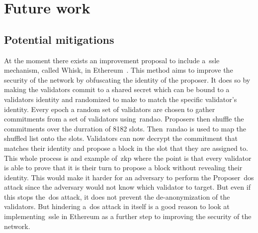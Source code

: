 

\section{Future work}\label{sec:future-works}

\subsection{Potential mitigations}\label{subsec:potential-mitigations}
At the moment there exists an improvement proposal
to include a~\gls{ssle} mechanism, called Whisk, in Ethereum~\cite{EthereumResearchSSLE2024}.
This method aims to improve the security of the network by obfuscating the identity of the proposer.
It does so by making the validators commit to a shared secret which can be bound to a validators identity and randomized to make to match the specific validator's identity.
Every epoch a random set of validators are chosen to gather commitments from a set of validators using~\gls{randao}.
Proposers then shuffle the commitments over the durration of 8182 slots.
Then~\gls{randao} is used to map the shuffled list onto the slots.
Validators can now decrypt the commitment that matches their identity and propose a block in the slot that they are assigned to.
This whole process is and example of~\gls{zkp} where the point is that every validator is able to prove that it is their turn to propose a block without revealing their identity.
This would make it harder
for an adversary to perform the Proposer~\gls{dos} attack since the adversary would not know which validator to target.
But even if this stops the~\gls{dos} attack, it does not prevent the de-anonymization of the validators.
But hindering a~\gls{dos} attack in itself is a good reason
to look at implementing~\gls{ssle} in Ethereum as a further step to improving the security of the network.
